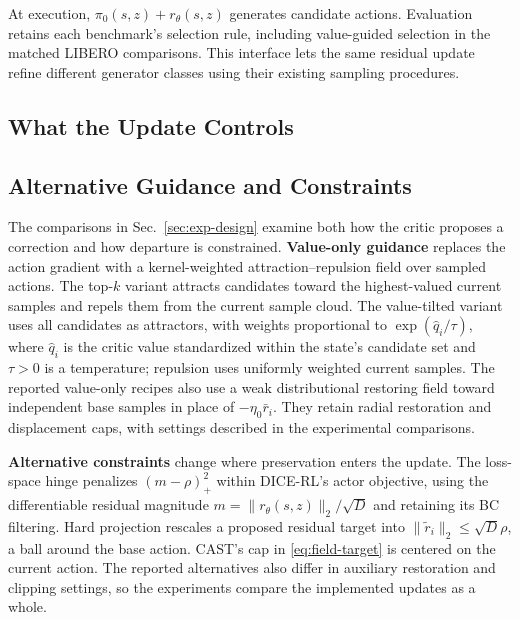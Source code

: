At execution, $\pi_0(s,z)+r_\theta(s,z)$ generates candidate actions.
Evaluation retains each benchmark's selection rule, including value-guided
selection in the matched LIBERO comparisons. This interface lets the same
residual update refine different generator classes using their existing
sampling procedures.



\subsection{What the Update Controls}
\label{sec:method-analysis}


\subsection{Alternative Guidance and Constraints}
\label{sec:method-variants}

The comparisons in Sec.~\ref{sec:exp-design} examine both how the critic
proposes a correction and how departure is constrained.
\textbf{Value-only guidance} replaces the action gradient with a
kernel-weighted attraction--repulsion field over sampled actions.
The top-$k$ variant attracts candidates toward the highest-valued current
samples and repels them from the current sample cloud. The value-tilted
variant uses all candidates as attractors, with weights proportional to
$\exp(\hat q_i/\tau)$, where $\hat q_i$ is the critic value standardized
within the state's candidate set and $\tau>0$ is a temperature; repulsion
uses uniformly weighted current samples. The reported value-only recipes
also use a weak distributional restoring field toward independent base
samples in place of $-\eta_0\bar r_i$. They retain radial restoration and
displacement caps, with settings described in the experimental comparisons.

\textbf{Alternative constraints} change where preservation enters the
update. The loss-space hinge penalizes $(m-\rho)_+^2$ within DICE-RL's
actor objective, using the differentiable residual magnitude
$m=\|r_\theta(s,z)\|_2/\sqrt D$ and retaining its BC filtering. Hard
projection rescales a proposed residual target
into $\|\tilde r_i\|_2\leq\sqrt{D}\rho$, a ball around the base action.
CAST's cap in \eqref{eq:field-target} is centered on the current action.
The reported alternatives also differ in auxiliary restoration and
clipping settings, so the experiments compare the implemented updates
as a whole.
